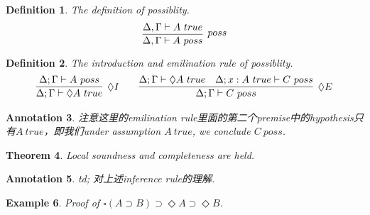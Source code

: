 \documentclass{article}
\theoremstyle{plain}
\newtheorem{theorem}{Theorem}
\newtheorem{example}[theorem]{Example}
\newtheorem{definition}[theorem]{Definition}
\newtheorem{annotation}[theorem]{Annotation}
\theoremstyle{nonumberplain}
\begin{document}
\begin{definition}
\rm \cite{15-816-ciom}The definition of possiblity.
$$
\infer[poss]{\Delta,\Gamma \vdash A~poss}{\Delta,\Gamma \vdash A~true}
$$
\end{definition}


\begin{definition}
\rm The introduction and emilination rule of possiblity.
$$
\begin{aligned}
\infer[\Diamond I]{\Delta;\Gamma \vdash \Diamond A~true}{\Delta;\Gamma \vdash A~poss} &&&&
\infer[\Diamond E]{\Delta;\Gamma \vdash C~poss}{\Delta;\Gamma \vdash \Diamond A~true & \Delta;x:A~true \vdash C~poss}
\end{aligned}
$$
\end{definition}

\begin{annotation}
\rm 注意这里的emilination rule里面的第二个premise中的hypothesis只有$A ~true$，即我们under assumption $A~true$, we conclude $C~poss$.
\end{annotation}

\begin{theorem}
\rm Local soundness and completeness are held. 
\end{theorem}

\begin{annotation}
\rm td; 对上述inference rule的理解. 
\end{annotation}

\begin{example}
\rm Proof of $\square(A \supset B) \supset \Diamond A \supset \Diamond B$.
\end{example}
\end{document}
